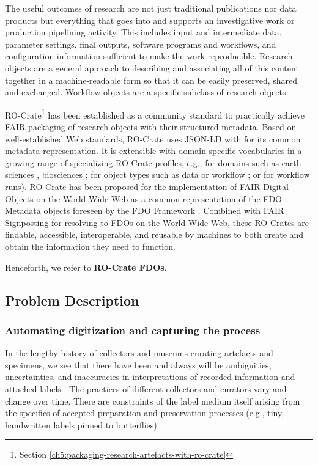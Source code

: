 The useful outcomes of research are not just traditional publications
nor data products but everything that goes into and supports an
investigative work or production pipelining activity. This includes
input and intermediate data, parameter settings, final outputs, software
programs and workflows, and configuration information sufficient to make
the work reproducible. Research objects \cite{Bechhofer 2013} are a general approach
to describing and associating all of this content together in a
machine-readable form so that it can be easily preserved, shared and
exchanged. Workflow objects are a specific subclass of research objects.

RO-Crate\footnote{Section \vref{ch5:packaging-research-artefacts-with-ro-crate}} \cite{Ó Carragáin 2019a,Soiland-Reyes 2022a} has been established as a community standard to
practically achieve FAIR packaging of research objects with their
structured metadata. Based on well-established Web standards, RO-Crate
uses JSON-LD \cite{Sporny 2020} with \cite{schema.org} for its common metadata representation. It is extensible with
domain-specific vocabularies in a growing range of specializing RO-Crate
profiles, e.g., for domains such as earth sciences \cite{Corcho 2021}, biosciences
\cite{Goble 2021}; for object types such as data or workflow \cite{Bacall 2022}; or for
workflow runs). RO-Crate has been proposed for the implementation of
FAIR Digital Objects on the World Wide Web as a common representation of
the FDO Metadata objects foreseen by the FDO Framework \cite{Goble 2021,Bonino 2019}.
Combined with FAIR \gls{Signposting} \cite{Van de Sompel 2022} for resolving 
to FDOs on the World Wide Web, these RO-Crates are
findable, accessible, interoperable, and reusable by machines to both
create and obtain the information they need to function.

Henceforth, we refer to \textbf{RO-Crate FDOs}.

\subsection{Problem Description}\label{problem-description}

\subsubsection{Automating digitization and capturing the process}\label{automating-digitization-and-capturing-the-process}


In the lengthy history of collectors and museums curating artefacts and
specimens, we see that there have been and always will be ambiguities,
uncertainties, and inaccuracies in interpretations of recorded
information and attached labels \cite{Lohonya 2020}. The practices of different
collectors and curators vary and change over time. There are constraints
of the label medium itself arising from the specifics of accepted
preparation and preservation processes (e.g., tiny, handwritten labels
pinned to butterflies).

